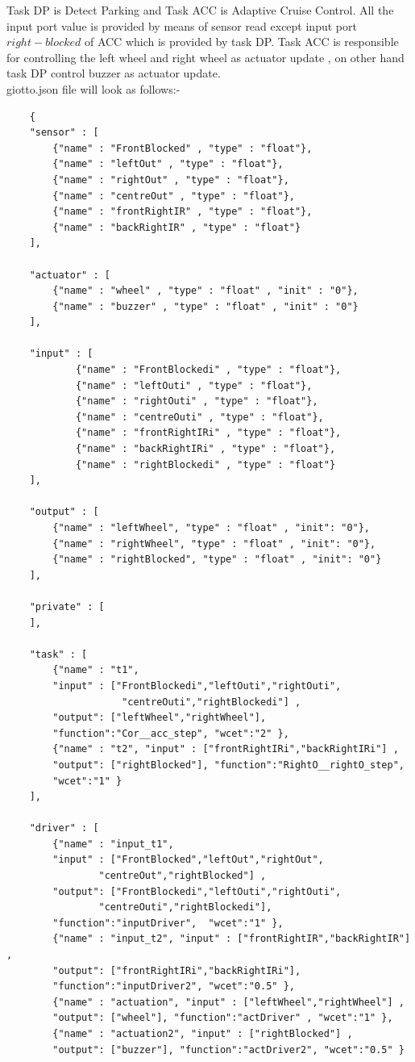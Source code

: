 \documentclass[16pt]{report}
\begin{document}
Task DP is Detect Parking and Task ACC is Adaptive Cruise Control.
All the input port value is provided by means of sensor read except input port $right-blocked$ of ACC which is provided by task DP.
Task ACC is responsible for controlling the left wheel and right wheel as actuator update , on other hand task DP control buzzer as actuator update.\\
giotto.json file will look as follows:-
\begin{verbatim}
    {
    "sensor" : [
        {"name" : "FrontBlocked" , "type" : "float"},
        {"name" : "leftOut" , "type" : "float"},
        {"name" : "rightOut" , "type" : "float"},
        {"name" : "centreOut" , "type" : "float"},
        {"name" : "frontRightIR" , "type" : "float"},
        {"name" : "backRightIR" , "type" : "float"}
    ],

    "actuator" : [
        {"name" : "wheel" , "type" : "float" , "init" : "0"},
        {"name" : "buzzer" , "type" : "float" , "init" : "0"}
    ],
    
    "input" : [
            {"name" : "FrontBlockedi" , "type" : "float"},
            {"name" : "leftOuti" , "type" : "float"},
            {"name" : "rightOuti" , "type" : "float"},
            {"name" : "centreOuti" , "type" : "float"},
            {"name" : "frontRightIRi" , "type" : "float"},
            {"name" : "backRightIRi" , "type" : "float"},
            {"name" : "rightBlockedi" , "type" : "float"}
    ],

    "output" : [
        {"name" : "leftWheel", "type" : "float" , "init": "0"},
        {"name" : "rightWheel", "type" : "float" , "init": "0"},
        {"name" : "rightBlocked", "type" : "float" , "init": "0"}
    ],

    "private" : [
    ],

    "task" : [
        {"name" : "t1", 
        "input" : ["FrontBlockedi","leftOuti","rightOuti",
                    "centreOuti","rightBlockedi"] ,
        "output": ["leftWheel","rightWheel"], 
        "function":"Cor__acc_step", "wcet":"2" },
        {"name" : "t2", "input" : ["frontRightIRi","backRightIRi"] , 
        "output": ["rightBlocked"], "function":"RightO__rightO_step", 
        "wcet":"1" }
    ],

    "driver" : [
        {"name" : "input_t1", 
        "input" : ["FrontBlocked","leftOut","rightOut",
                "centreOut","rightBlocked"] , 
        "output": ["FrontBlockedi","leftOuti","rightOuti",
                "centreOuti","rightBlockedi"], 
        "function":"inputDriver",  "wcet":"1" },
        {"name" : "input_t2", "input" : ["frontRightIR","backRightIR"] ,
        "output": ["frontRightIRi","backRightIRi"], 
        "function":"inputDriver2", "wcet":"0.5" },
        {"name" : "actuation", "input" : ["leftWheel","rightWheel"] ,
        "output": ["wheel"], "function":"actDriver" , "wcet":"1" },
        {"name" : "actuation2", "input" : ["rightBlocked"] , 
        "output": ["buzzer"], "function":"actDriver2", "wcet":"0.5" }


\end{verbatim}
\end{document}
